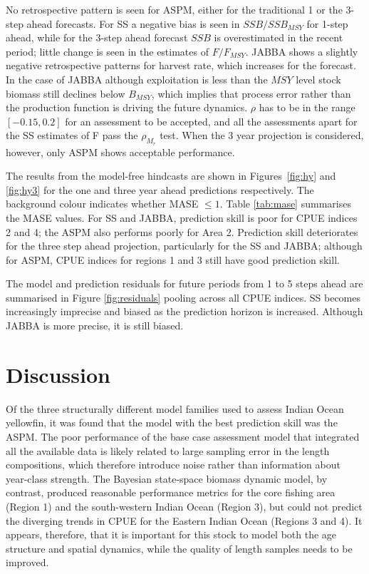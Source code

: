 \documentclass[12pt,halfline,a4paper,nonumbib]{ouparticle}
\begin{document}
No retrospective pattern is seen for ASPM, either for the traditional 1 or the 3-step ahead forecasts. For SS a negative bias is seen in $SSB/SSB_{MSY}$ for 1-step ahead, while for the 3-step ahead forecast $SSB$ is overestimated in the recent period; little change is seen in the estimates of $F/F_{MSY}$. JABBA shows a slightly negative retrospective patterns for harvest rate, which increases for the forecast. In the case of JABBA although exploitation is less than the ${MSY}$ level stock biomass still declines below $B_{MSY}$, which implies that process error rather than the production function is driving the future dynamics. $\rho$ has to be in the range $[-0.15,0.2]$ for an assessment to be accepted, and all the assessments apart for the SS estimates of F pass the $\rho_{M_r}$ test. When the 3 year projection is considered, however, only ASPM shows acceptable performance. 

The results from the model-free hindcasts are shown in Figures~\ref{fig:hy} and \ref{fig:hy3} for the one and three year ahead predictions respectively. The background colour indicates whether MASE $\le 1$. Table \ref{tab:mase} summarises the MASE values. For SS and JABBA, prediction skill is poor for CPUE indices 2 and 4; the ASPM also performs poorly for Area 2. Prediction skill deteriorates for the three step ahead projection, particularly for the SS and JABBA; although for ASPM, CPUE indices for regions 1 and 3 still have good prediction skill. 

The model and prediction residuals for future periods from 1 to 5 steps ahead are summarised in Figure \ref{fig:residuals} pooling across all CPUE indices. SS becomes increasingly imprecise and biased as the prediction horizon is increased. Although JABBA is more precise, it is still biased.

\section{Discussion}

Of the three structurally different model families used to assess Indian Ocean yellowfin, it was found that the model with the best prediction skill was the ASPM. The poor performance of the base case assessment model that integrated all the available data is likely related to large sampling error in the length compositions, which therefore introduce noise rather than information about year-class strength. The Bayesian state-space biomass dynamic model, by contrast, produced reasonable performance metrics for the core fishing area (Region 1) and the south-western Indian Ocean (Region 3), but could not predict the diverging trends in CPUE for the Eastern Indian Ocean (Regions 3 and 4). It appears, therefore, that it is important for this stock to model both the age structure and spatial dynamics, while the quality of length samples needs to be improved. 
\end{document}

